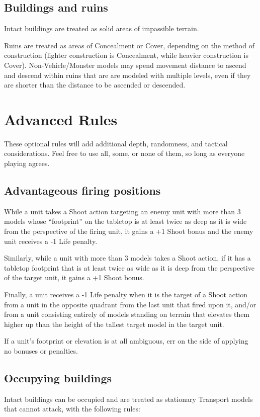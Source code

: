 \begin{multicols}{2}
\section*{Buildings and ruins}
Intact buildings are treated as solid areas of impassible terrain.

Ruins are treated as areas of Concealment or Cover, depending on the method of construction (lighter construction is Concealment, while heavier construction is Cover). Non-Vehicle/Monster models may spend movement distance to ascend and descend within ruins that are are modeled with multiple levels, even if they are shorter than the distance to be ascended or descended.





\chapter*{Advanced Rules}
These optional rules will add additional depth, randomness, and tactical considerations. Feel free to use all, some, or none of them, so long as everyone playing agrees.




\section*{Advantageous firing positions}
While a unit takes a Shoot action targeting an enemy unit with more than 3 models whose ``footprint'' on the tabletop is at least twice as deep as it is wide from the perspective of the firing unit, it gains a +1 Shoot bonus and the enemy unit receives a -1 Life penalty.

Similarly, while a unit with more than 3 models takes a Shoot action, if it has a tabletop footprint that is at least twice as wide as it is deep from the perspective of the target unit, it gains a +1 Shoot bonus.

Finally, a unit receives a -1 Life penalty when it is the target of a Shoot action from a unit in the opposite quadrant from the last unit that fired upon it, and/or from a unit consisting entirely of models standing on terrain that elevates them higher up than the height of the tallest target model in the target unit.

If a unit's footprint or elevation is at all ambiguous, err on the side of applying no bonuses or penalties.




\section*{Occupying buildings}
Intact buildings can be occupied and are treated as stationary Transport models that cannot attack, with the following rules:


\end{multicols}
